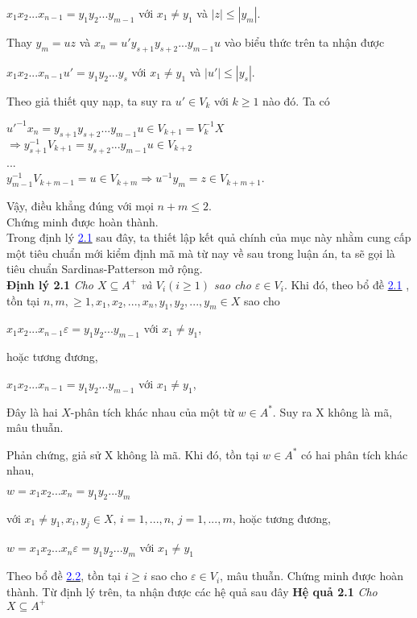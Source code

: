 $x_1x_2...x_{n-1} = y_1y_2...y_{m-1}$ với $x_1 \ne y_1$ và $|z| \le |y_m|$.
\begin{flushleft}
Thay $y_m = uz$ và $x_n = u'y_{s+1}y_{s+2}...y_{m-1}u$ vào biểu thức trên ta nhận được 
\end{flushleft}
$x_1x_2...x_{n-1}u' = y_1y_2...y_s$ với $x_1 \ne y_1$ và $|u'| \le |y_s|$.
\begin{flushleft}
Theo giả thiết quy nạp, ta suy ra $u' \in V_k$ với $k \ge 1$ nào đó. Ta có 
\end{flushleft}
$u'^{-1}x_n = y_{s+1}y_{s+2}...y_{m-1}u \in V_{k+1} = V_k^{-1}X$ \\
$\Rightarrow y_{s+1}^{-1}V_{k+1} = y_{s+2}...y_{m-1}u \in V_{k+2}$\\
...\\
$y_{m-1}^{-1}V_{k+m-1} = u \in V_{k+m} \Rightarrow u^{-1}y_m = z \in V_{k+m+1}$.
\begin{flushleft}
Vậy, điều khẳng đúng với mọi $n+m \le 2$.\\
Chứng minh được hoàn thành.\\
\hspace{10mm}Trong định lý \hyperlink{page.43}{\textcolor{blue}{2.1}} sau đây, ta thiết lập kết quả chính của mục này nhằm cung cấp một tiêu chuẩn mới kiểm định mã mà từ nay về sau trong luận án, ta sẽ gọi là tiêu chuẩn Sardinas-Patterson mở rộng.\\
\textbf{Định lý 2.1}    \textit{Cho $X \subseteq A^+$ và $V_i(i \ge 1)$ sao cho $\varepsilon \in V_i$}. Khi đó, theo bổ đề \hyperlink{page.43}{\textcolor{blue}{2.1}} , tồn tại $n,m, \ge 1, x_1, x_2,..., x_n, y_1, y_2,...,y_m \in X$ sao cho
\end{flushleft}
$x_1x_2...x_{n-1}\varepsilon = y_1y_2...y_{m-1}$ với $x_1 \ne y_1$,
\begin{flushleft}
hoặc tương đương,
\end{flushleft}
$x_1x_2...x_{n-1} = y_1y_2...y_{m-1}$ với $x_1 \ne y_1$,
\begin{flushleft}
Đây là hai $X$-phân tích khác nhau của một từ $w \in A^*$. Suy ra X không là mã, mâu thuẫn.

\hspace{10mm}Phản chứng, giả sử X không là mã. Khi đó, tồn tại $w \in A^*$ có hai phân tích khác nhau, 
\end{flushleft}
$w = x_1x_2...x_n = y_1y_2...y_m$
\begin{flushleft}
với $x_1 \ne y_1, x_i, y_j \in X$, $i = 1,...,n$, $j = 1,...,m$, hoặc tương đương,
\end{flushleft}
$w = x_1x_2...x_n\varepsilon = y_1y_2...y_m$ với $x_1 \ne y_1$
\begin{flushleft}
Theo bổ đề \hyperlink{page.43}{\textcolor{blue}{2.2}}, tồn tại $i \ge i$ sao cho $\varepsilon \in V_i$, mâu thuẫn.
\hspace{10mm}Chứng minh được hoàn thành.
\hspace{10mm}Từ định lý trên, ta nhận được các hệ quả sau đây
\textbf{Hệ quả 2.1}     \textit{Cho $X \subseteq A^+$}

\end{flushleft}



